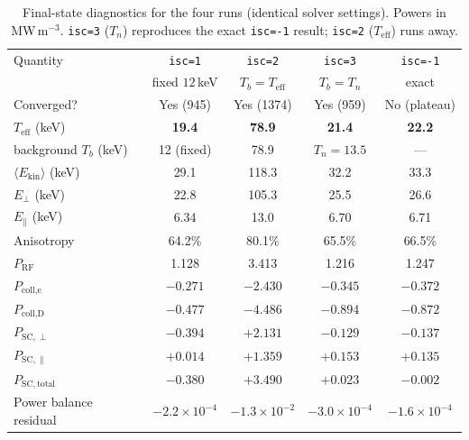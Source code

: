\documentclass[11pt,a4paper]{article}
\begin{document}
\begin{table}[h]
\centering
\caption{Final-state diagnostics for the four runs (identical solver
  settings). Powers in MW\,m$^{-3}$. \texttt{isc=3} ($T_n$) reproduces the
  exact \texttt{isc=-1} result; \texttt{isc=2} ($T_\text{eff}$) runs away.}
\label{tab:results}
\begin{tabular}{lcccc}
\toprule
Quantity & \texttt{isc=1} & \texttt{isc=2} & \texttt{isc=3} & \texttt{isc=-1} \\
         & fixed $12$\,keV & $T_b=T_\text{eff}$ & $T_b=T_n$ & exact \\
\midrule
Converged?                  & Yes (945)  & Yes (1374) & Yes (959) & No (plateau)\footnotemark \\
$T_\text{eff}$ (keV)        & \textbf{19.4}   & \textbf{78.9}   & \textbf{21.4} & \textbf{22.2} \\
background $T_b$ (keV)       & 12 (fixed)      & 78.9            & $T_n=13.5$    & --- \\
$\langle E_\text{kin}\rangle$ (keV) & 29.1    & 118.3           & 32.2          & 33.3 \\
$E_\perp$ (keV)             & 22.8            & 105.3           & 25.5          & 26.6 \\
$E_\parallel$ (keV)         & 6.34            & 13.0            & 6.70          & 6.71 \\
Anisotropy                  & 64.2\%          & 80.1\%          & 65.5\%        & 66.5\% \\
\midrule
$P_\text{RF}$               & 1.128           & 3.413           & 1.216         & 1.247 \\
$P_\text{coll,e}$           & $-0.271$        & $-2.430$        & $-0.345$      & $-0.372$ \\
$P_\text{coll,D}$           & $-0.477$        & $-4.486$        & $-0.894$      & $-0.872$ \\
$P_{\mathrm{SC},\perp}$     & $-0.394$        & $+2.131$        & $-0.129$      & $-0.137$ \\
$P_{\mathrm{SC},\parallel}$ & $+0.014$        & $+1.359$        & $+0.153$      & $+0.135$ \\
$P_{\mathrm{SC,total}}$     & $\mathbf{-0.380}$ & $\mathbf{+3.490}$ & $\mathbf{+0.023}$ & $\mathbf{-0.002}$ \\
Power balance residual      & $-2.2\times10^{-4}$ & $-1.3\times10^{-2}$ & $-3.0\times10^{-4}$ & $-1.6\times10^{-4}$ \\
\bottomrule
\end{tabular}
\end{table}
\end{document}
